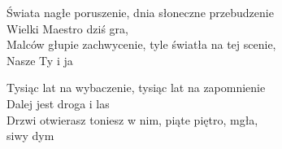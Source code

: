 
\begin{text}
    Świata nagłe poruszenie, dnia słoneczne przebudzenie\\
    Wielki Maestro dziś gra,\\
    Malców głupie zachwycenie, tyle światła na tej scenie,\\
    Nasze Ty i ja

    Tysiąc lat na wybaczenie, tysiąc lat na zapomnienie\\
    Dalej jest droga i las\\
    Drzwi otwierasz toniesz w nim, piąte piętro, mgła,\\
    siwy dym
\end{text}
\begin{chord}

\end{chord}